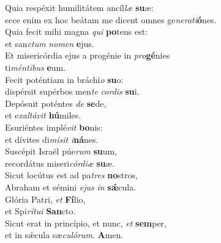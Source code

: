 \oddverse Quia respéxit humilitátem ancíl\textit{læ} \textbf{su}æ:~\*\\
\oddverse ecce enim ex hoc beátam me dicent omnes ge\textit{ne}\textit{ra}\textit{ti}\textbf{ó}nes.\\
\evenverse Quia fecit mihi magna \textit{qui} \textbf{po}tens est:~\*\\
\evenverse et san\textit{ctum} \textit{no}\textit{men} \textbf{e}jus.\\
\oddverse Et misericórdia ejus a progénie in \textit{pro}\textbf{gé}nies~\*\\
\oddverse ti\textit{mén}\textit{ti}\textit{bus} \textbf{e}um.\\
\evenverse Fecit poténtiam in bráchi\textit{o} \textbf{su}o:~\*\\
\evenverse dispérsit supérbos men\textit{te} \textit{cor}\textit{dis} \textbf{su}i.\\
\oddverse Depósuit poténtes \textit{de} \textbf{se}de,~\*\\
\oddverse et e\textit{xal}\textit{tá}\textit{vit} \textbf{hú}miles.\\
\evenverse Esuriéntes implé\textit{vit} \textbf{bo}nis:~\*\\
\evenverse et dívites di\textit{mí}\textit{sit} \textit{i}\textbf{ná}nes.\\
\oddverse Suscépit Israël púe\textit{rum} \textbf{su}um,~\*\\
\oddverse recordátus miseri\textit{cór}\textit{di}\textit{æ} \textbf{su}æ.\\
\evenverse Sicut locútus est ad pa\textit{tres} \textbf{no}stros,~\*\\
\evenverse Abraham et sémini \textit{e}\textit{jus} \textit{in} \textbf{sǽ}cula.\\
\oddverse Glória Patri, \textit{et} \textbf{Fí}lio,~\*\\
\oddverse et Spi\textit{rí}\textit{tu}\textit{i} \textbf{San}cto.\\
\evenverse Sicut erat in princípio, et nunc, \textit{et} \textbf{sem}per,~\*\\
\evenverse et in sǽcula sæ\textit{cu}\textit{ló}\textit{rum}. \textbf{A}men.\\
